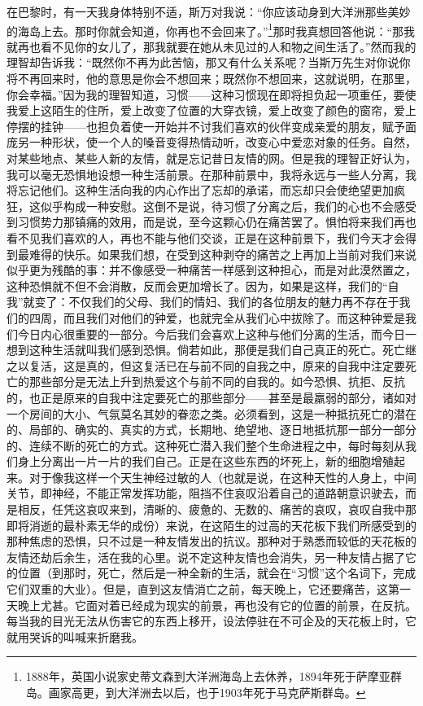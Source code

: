 \par 在巴黎时，有一天我身体特别不适，斯万对我说：“你应该动身到大洋洲那些美妙的海岛上去。那时你就会知道，你再也不会回来了。”\footnote{1888年，英国小说家史蒂文森到大洋洲海岛上去休养，1894年死于萨摩亚群岛。画家高更，到大洋洲去以后，也于1903年死于马克萨斯群岛。}那时我真想回答他说：“那我就再也看不见你的女儿了，那我就要在她从未见过的人和物之间生活了。”然而我的理智却告诉我：“既然你不再为此苦恼，那又有什么关系呢？当斯万先生对你说你将不再回来时，他的意思是你会不想回来；既然你不想回来，这就说明，在那里，你会幸福。”因为我的理智知道，习惯——这种习惯现在即将担负起一项重任，要使我爱上这陌生的住所，爱上改变了位置的大穿衣镜，爱上改变了颜色的窗帘，爱上停摆的挂钟——也担负着使一开始并不讨我们喜欢的伙伴变成亲爱的朋友，赋予面庞另一种形状，使一个人的嗓音变得热情动听，改变心中爱恋对象的任务。自然，对某些地点、某些人新的友情，就是忘记昔日友情的网。但是我的理智正好认为，我可以毫无恐惧地设想一种生活前景。在那种前景中，我将永远与一些人分离，我将忘记他们。这种生活向我的内心作出了忘却的承诺，而忘却只会使绝望更加疯狂，这似乎构成一种安慰。这倒不是说，待习惯了分离之后，我们的心也不会感受到习惯势力那镇痛的效用，而是说，至今这颗心仍在痛苦罢了。惧怕将来我们再也看不见我们喜欢的人，再也不能与他们交谈，正是在这种前景下，我们今天才会得到最难得的快乐。如果我们想，在受到这种剥夺的痛苦之上再加上当前对我们来说似乎更为残酷的事：并不像感受一种痛苦一样感到这种担心，而是对此漠然置之，这种恐惧就不但不会消散，反而会更加增长了。因为，如果是这样，我们的“自我”就变了：不仅我们的父母、我们的情妇、我们的各位朋友的魅力再不存在于我们的四周，而且我们对他们的钟爱，也就完全从我们心中拔除了。而这种钟爱是我们今日内心很重要的一部分。今后我们会喜欢上这种与他们分离的生活，而今日一想到这种生活就叫我们感到恐惧。倘若如此，那便是我们自己真正的死亡。死亡继之以复活，这是真的，但这复活已在与前不同的自我之中，原来的自我中注定要死亡的那些部分是无法上升到热爱这个与前不同的自我的。如今恐惧、抗拒、反抗的，也正是原来的自我中注定要死亡的那些部分——甚至是最羸弱的部分，诸如对一个房间的大小、气氛莫名其妙的眷恋之类。必须看到，这是一种抵抗死亡的潜在的、局部的、确实的、真实的方式，长期地、绝望地、逐日地抵抗那一部分一部分的、连续不断的死亡的方式。这种死亡潜入我们整个生命进程之中，每时每刻从我们身上分离出一片一片的我们自己。正是在这些东西的坏死上，新的细胞增殖起来。对于像我这样一个天生神经过敏的人（也就是说，在这种天性的人身上，中间关节，即神经，不能正常发挥功能，阻挡不住哀叹沿着自己的道路朝意识驶去，而是相反，任凭这哀叹来到，清晰的、疲惫的、无数的、痛苦的哀叹，哀叹自我中那即将消逝的最朴素无华的成份）来说，在这陌生的过高的天花板下我们所感受到的那种焦虑的恐惧，只不过是一种友情发出的抗议。那种对于熟悉而较低的天花板的友情还劫后余生，活在我的心里。说不定这种友情也会消失，另一种友情占据了它的位置（到那时，死亡，然后是一种全新的生活，就会在“习惯”这个名词下，完成它们双重的大业）。但是，直到这友情消亡之前，每天晚上，它还要痛苦，这第一天晚上尤甚。它面对着已经成为现实的前景，再也没有它的位置的前景，在反抗。每当我的目光无法从伤害它的东西上移开，设法停驻在不可企及的天花板上时，它就用哭诉的叫喊来折磨我。
